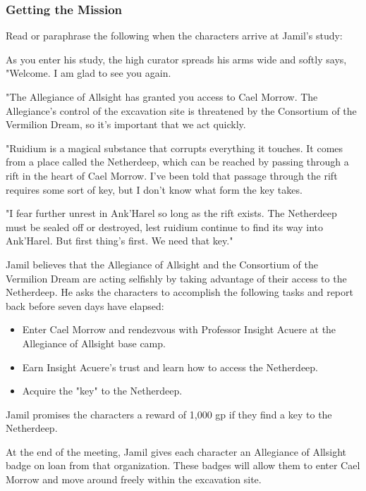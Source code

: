 \documentclass[10pt,a4paper,twoside,twocolumn,openany,nodeprecatedcode]{dndbook}
\begin{document}
\subsubsection{Getting the Mission}
Read or paraphrase the following when the characters arrive at Jamil's study:

\begin{DndReadAloud}{}
As you enter his study, the high curator spreads his arms wide and softly says, "Welcome. I am glad to see you again.

"The Allegiance of Allsight has granted you access to Cael Morrow. The Allegiance's control of the excavation site is threatened by the Consortium of the Vermilion Dream, so it's important that we act quickly.

"Ruidium is a magical substance that corrupts everything it touches. It comes from a place called the Netherdeep, which can be reached by passing through a rift in the heart of Cael Morrow. I've been told that passage through the rift requires some sort of key, but I don't know what form the key takes.

"I fear further unrest in Ank'Harel so long as the rift exists. The Netherdeep must be sealed off or destroyed, lest ruidium continue to find its way into Ank'Harel. But first thing's first. We need that key."

\end{DndReadAloud}

Jamil believes that the Allegiance of Allsight and the Consortium of the Vermilion Dream are acting selfishly by taking advantage of their access to the Netherdeep. He asks the characters to accomplish the following tasks and report back before seven days have elapsed:


\begin{itemize}
\item Enter Cael Morrow and rendezvous with Professor Insight Acuere at the Allegiance of Allsight base camp.
\item Earn Insight Acuere's trust and learn how to access the Netherdeep.
\item Acquire the "key" to the Netherdeep.
\end{itemize}

Jamil promises the characters a reward of 1,000 gp if they find a key to the Netherdeep.

At the end of the meeting, Jamil gives each character an Allegiance of Allsight badge on loan from that organization. These badges will allow them to enter Cael Morrow and move around freely within the excavation site.
\end{document}
